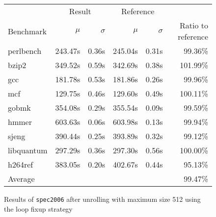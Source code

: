 \begin{figure}[h]
    \begin{center}
        \begin{tabular}{lrrrrr}
            \toprule
            & \multicolumn{2}{c}{Result} & \multicolumn{2}{c}{Reference}\\
            Benchmark & $\mu$ & $\sigma$ & $\mu$ & $\sigma$ & Ratio to reference\\
            \midrule
            perlbench & 243.47s & 0.36s & 245.04s & 0.31s & 99.36\%\\
            bzip2 & 349.52s & 0.59s & 342.69s & 0.38s & 101.99\%\\
            gcc & 181.78s & 0.53s & 181.86s & 0.26s & 99.96\%\\
            mcf & 129.75s & 0.46s & 129.60s & 0.49s & 100.11\%\\
            gobmk & 354.08s & 0.29s & 355.54s & 0.09s & 99.59\%\\
            hmmer & 603.63s & 0.06s & 603.98s & 0.13s & 99.94\%\\
            sjeng & 390.44s & 0.25s & 393.89s & 0.32s & 99.12\%\\
            libquantum & 297.29s & 0.36s & 297.30s & 0.56s & 100.00\%\\
            h264ref & 383.05s & 0.20s & 402.67s & 0.44s & 95.13\%\\
            \midrule
            Average & & & & & 99.47\%\\
            \bottomrule
        \end{tabular}
    \end{center}
    \caption{Results of \texttt{spec2006} after unrolling with maximum size 512 using the loop fixup strategy}
    \label{fig:eval:perf:loop:512}
\end{figure}
